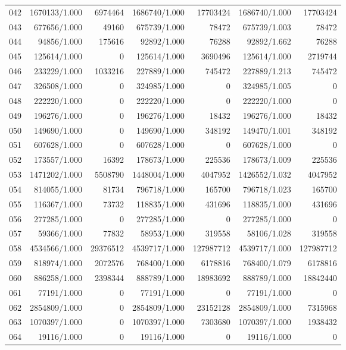 \begin{longtable}{crrrrrr}
042 & 1670133/1.000 & 6974464 & 1686740/1.000 & 17703424 & 1686740/1.000 & 17703424 \\
043 & 677656/1.000 & 49160 & 675739/1.000 & 78472 & 675739/1.003 & 78472 \\
044 & 94856/1.000 & 175616 & 92892/1.000 & 76288 & 92892/1.662 & 76288 \\
045 & 125614/1.000 & 0 & 125614/1.000 & 3690496 & 125614/1.000 & 2719744 \\
046 & 233229/1.000 & 1033216 & 227889/1.000 & 745472 & 227889/1.213 & 745472 \\
047 & 326508/1.000 & 0 & 324985/1.000 & 0 & 324985/1.005 & 0 \\
048 & 222220/1.000 & 0 & 222220/1.000 & 0 & 222220/1.000 & 0 \\
049 & 196276/1.000 & 0 & 196276/1.000 & 18432 & 196276/1.000 & 18432 \\
050 & 149690/1.000 & 0 & 149690/1.000 & 348192 & 149470/1.001 & 348192 \\
051 & 607628/1.000 & 0 & 607628/1.000 & 0 & 607628/1.000 & 0 \\
052 & 173557/1.000 & 16392 & 178673/1.000 & 225536 & 178673/1.009 & 225536 \\
053 & 1471202/1.000 & 5508790 & 1448004/1.000 & 4047952 & 1426552/1.032 & 4047952 \\
054 & 814055/1.000 & 81734 & 796718/1.000 & 165700 & 796718/1.023 & 165700 \\
055 & 116367/1.000 & 73732 & 118835/1.000 & 431696 & 118835/1.000 & 431696 \\
056 & 277285/1.000 & 0 & 277285/1.000 & 0 & 277285/1.000 & 0 \\
057 & 59366/1.000 & 77832 & 58953/1.000 & 319558 & 58106/1.028 & 319558 \\
058 & 4534566/1.000 & 29376512 & 4539717/1.000 & 127987712 & 4539717/1.000 & 127987712 \\
059 & 818974/1.000 & 2072576 & 768400/1.000 & 6178816 & 768400/1.079 & 6178816 \\
060 & 886258/1.000 & 2398344 & 888789/1.000 & 18983692 & 888789/1.000 & 18842440 \\
061 & 77191/1.000 & 0 & 77191/1.000 & 0 & 77191/1.000 & 0 \\
062 & 2854809/1.000 & 0 & 2854809/1.000 & 23152128 & 2854809/1.000 & 7315968 \\
063 & 1070397/1.000 & 0 & 1070397/1.000 & 7303680 & 1070397/1.000 & 1938432 \\
064 & 19116/1.000 & 0 & 19116/1.000 & 0 & 19116/1.000 & 0 \\

\end{longtable}
